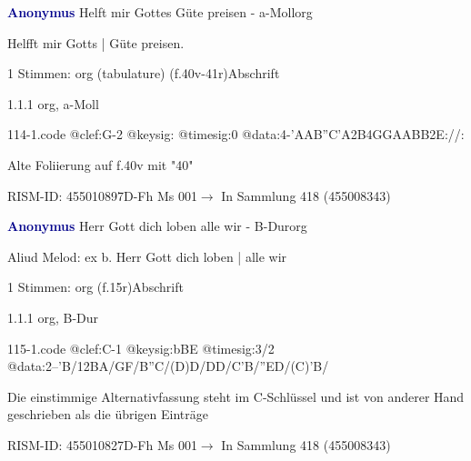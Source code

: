 \documentclass[twocolumn]{book}
\begin{document}
\par \vspace{7pt} \textcolor{darkblue}{\textbf{Anonymus  }}\hfillplus{\textbf{[114]}}\newline Helft mir Gottes Güte preisen - a-Moll\newline org
\par \begin{itshape}[f.40v, at left:] Helfft mir Gotts | Güte preisen.\end{itshape} 
\par \textcolor{darkblue}{}  1 Stimmen: org (tabulature)  (f.40v-41r)\newline Abschrift
\par 1.1.1  org, a-Moll  
\begin{filecontents*}{114-1.code}
@clef:G-2
@keysig:
@timesig:0
@data:4-'AAB''C'A2B4GGAABB2E://:
\end{filecontents*}
\newline
%
\par Alte Foliierung auf f.40v mit "40"
\par RISM-ID: 455010897\newline D-Fh  Ms 001\newline $\rightarrow$ In Sammlung 418 (455008343)
      
\par \vspace{7pt} \textcolor{darkblue}{\textbf{Anonymus  }}\hfillplus{\textbf{[115]}}\newline Herr Gott dich loben alle wir - B-Dur\newline org
\par \begin{itshape} Aliud Melod: ex b. Herr Gott dich loben | alle wir\end{itshape} 
\par \textcolor{darkblue}{}  1 Stimmen: org  (f.15r)\newline Abschrift
\par 1.1.1  org, B-Dur  
\begin{filecontents*}{115-1.code}
@clef:C-1
@keysig:bBE
@timesig:3/2
@data:2--'B/12BA/GF/B''C/(D)D/DD/C'B/''ED/(C)'B/
\end{filecontents*}
\newline
%
\par Die einstimmige Alternativfassung steht im C-Schlüssel und ist von anderer Hand geschrieben als die übrigen Einträge
\par RISM-ID: 455010827\newline D-Fh  Ms 001\newline $\rightarrow$ In Sammlung 418 (455008343)
      
\end{document}
